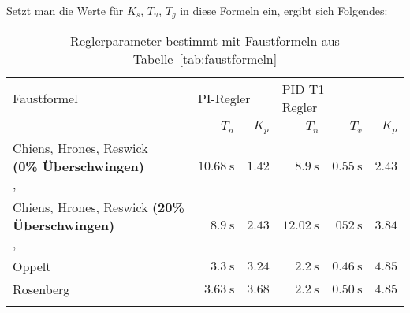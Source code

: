 \clearpage
Setzt man die Werte f\"ur $K_s$, $T_u$, $T_g$ in diese Formeln ein, ergibt sich Folgendes:

\begin{longtable}{p{50mm}rrrrr}
    \toprule


    Faustformel
    &
    \multicolumn{2}{l}{PI-Regler}
    &
    \multicolumn{2}{l}{PID-T1-Regler}
    \\

    &
    $T_n$
    &
    $K_p$
    &
    $T_n$
    &
    $T_v$
    &
    $K_p$
    \\

    \midrule

    \endhead
    \endfoot
    \endlastfoot


    \pbox{45mm}{Chiens, Hrones, Reswick \\ \small{\textbf{(0\% \"Uberschwingen)}} \\ \cite{ref:chiens_tsn}, \cite{ref:chiens_wiki}}
    &
    $\SI{10.68}{\second}$
    &
    $1.42$
    &
    $\SI{8.9}{\second}$
    &
    $\SI{0.55}{\second}$
    &
    $2.43$
    \\

    \addlinespace[1em]

    \pbox{45mm}{Chiens, Hrones, Reswick \small{\textbf{(20\% \"Uberschwingen)}} \\ \cite{ref:chiens_tsn}, \cite{ref:chiens_wiki}}
    &
    $\SI{8.9}{\second}$
    &
    $2.43$
    &
    $\SI{12.02}{\second}$
    &
    $\SI{052}{\second}$
    &
    $3.84$
    \\

    \addlinespace[1em]

    Oppelt \cite{ref:op_ros_zieg}
    &
    $\SI{3.3}{\second}$
    &
    $3.24$
    &
    $\SI{2.2}{\second}$
    &
    $\SI{0.46}{\second}$
    &
    $4.85$
    \\

    \addlinespace[1em]

    Rosenberg \cite{ref:op_ros_zieg}
    &
    $\SI{3.63}{\second}$
    &
    $3.68$
    &
    $\SI{2.2}{\second}$
    &
    $\SI{0.50}{\second}$
    &
    $4.85$
    \\

    \addlinespace[1em]

    \bottomrule
    \caption{Reglerparameter bestimmt mit Faustformeln aus Tabelle~\ref{tab:faustformeln}}
\label{tab:ff_results}
\end{longtable}
